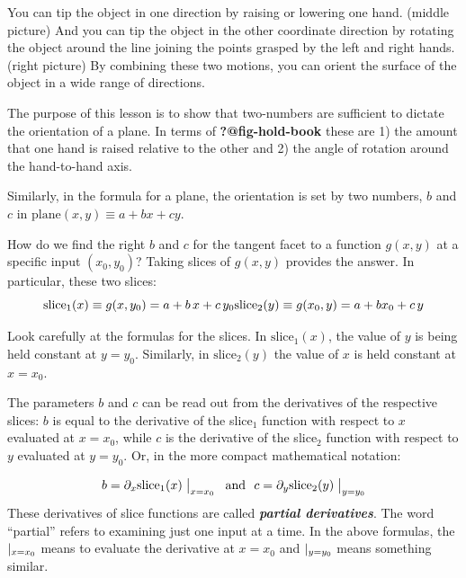 \documentclass[
  letterpaper,
  DIV=11,
  numbers=noendperiod,
  oneside]{scrreprt}
\begin{document}
You can tip the object in one direction by raising or lowering one hand.
(middle picture) And you can tip the object in the other coordinate
direction by rotating the object around the line joining the points
grasped by the left and right hands. (right picture) By combining these
two motions, you can orient the surface of the object in a wide range of
directions.

The purpose of this lesson is to show that two-numbers are sufficient to
dictate the orientation of a plane. In terms of \textbf{?@fig-hold-book}
these are 1) the amount that one hand is raised relative to the other
and 2) the angle of rotation around the hand-to-hand axis.

Similarly, in the formula for a plane, the orientation is set by two
numbers, \(b\) and \(c\) in \(\text{plane}(x, y) \equiv a + b x + c y\).

How do we find the right \(b\) and \(c\) for the tangent facet to a
function \(g(x,y)\) at a specific input \((x_0, y_0)\)? Taking slices of
\(g(x,y)\) provides the answer. In particular, these two slices:
\[\text{slice}_1(x) \equiv g(x, y_0) = a + b\, x + c\, y_0 \\ \text{slice}_2(y) \equiv g(x_0, y) = a + b x_0 + c\, y\]

Look carefully at the formulas for the slices. In \(\text{slice}_1(x)\),
the value of \(y\) is being held constant at \(y=y_0\). Similarly, in
\(\text{slice}_2(y)\) the value of \(x\) is held constant at \(x=x_0\).

The parameters \(b\) and \(c\) can be read out from the derivatives of
the respective slices: \(b\) is equal to the derivative of the
slice\(_1\) function with respect to \(x\) evaluated at \(x=x_0\), while
\(c\) is the derivative of the slice\(_2\) function with respect to
\(y\) evaluated at \(y=y_0\). Or, in the more compact mathematical
notation:

\[b = \partial_x \text{slice}_1(x)\left.\strut\right|_{x=x_0} \ \ \text{and}\ \ c=\partial_y \text{slice}_2(y)\left.\strut\right|_{y=y_0}\]
These derivatives of slice functions are called \textbf{\emph{partial
derivatives}}. The word ``partial'' refers to examining just one input
at a time. In the above formulas, the \({\large |}_{x=x_0}\) means to
evaluate the derivative at \(x=x_0\) and \({\large |}_{y=y_0}\) means
something similar.
\end{document}
